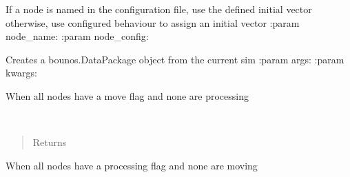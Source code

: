 \documentclass[letterpaper,10pt,english]{sphinxmanual}
\begin{document}
\begin{fulllineitems}
\begin{fulllineitems}
\end{fulllineitems}


\begin{fulllineitems}
\label{index:aietes.Simulation.generate_a_node}
If a node is named in the configuration file, use the defined initial vector
otherwise, use configured behaviour to assign an initial vector
:param node\_name:
:param node\_config:

\end{fulllineitems}


\begin{fulllineitems}
\label{index:aietes.Simulation.generate_datapackage}
Creates a bounos.DataPackage object from the current sim
:param args:
:param kwargs:

\end{fulllineitems}


\begin{fulllineitems}
\label{index:aietes.Simulation.inner_join}
When all nodes have a move flag and none are processing

\end{fulllineitems}


\begin{fulllineitems}
\label{index:aietes.Simulation.now}~\begin{quote}\begin{description}
\item[{Returns}] \leavevmode


\end{description}\end{quote}

\end{fulllineitems}


\begin{fulllineitems}
\label{index:aietes.Simulation.outer_join}
When all nodes have a processing flag and none are moving


\end{fulllineitems}
\end{fulllineitems}
\end{document}
